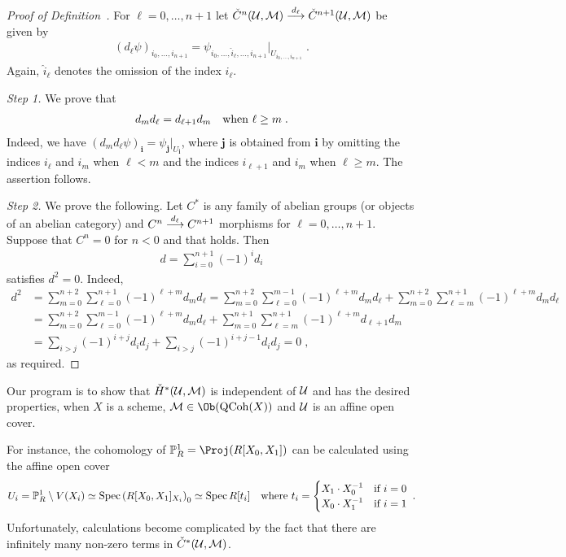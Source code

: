 \documentclass[a4paper,parskip=half,numbers=enddot, DIV=12]{scrreprt}
\begin{document}
\begin{proof}[Proof of Definition~]
	For $\ell=0,\ldots,n+1$ let $\check{C}^n(\Uu,\Mm)\morphism[d_\ell]\check{C}^{n+1}(\Uu,\Mm)$ be given by
	\begin{align*}
		(d_\ell\psi)_{i_0,\ldots,i_{n+1}}=\psi_{i_0,\ldots,\hat{i}_\ell,\ldots,i_{n+1}}|_{U_{i_0,\ldots,i_{n+1}}}\;.
	\end{align*}
	Again, $\hat{i}_\ell$ denotes the omission of the index $i_\ell$.
	
	\emph{Step 1.} We prove that
	\begin{align}\lbl{eq:simplicialStuff}
		d_md_\ell=d_{\ell+1}d_m\quad\text{when }\ell\geq m\;.
	\end{align}
	Indeed, we have $(d_md_\ell\psi)_{\mathbf{i}}=\psi_{\mathbf{j}}|_{U_{\mathbf{i}}}$, where $\mathbf{j}$ is obtained from $\mathbf{i}$ by omitting the indices $i_\ell$ and $i_m$ when $\ell<m$ and the indices $i_{\ell+1}$ and $i_m$ when $\ell\geq m$. The assertion follows.
	
	\emph{Step 2.} We prove the following. Let $C^*$ is any family of abelian groups (or objects of an abelian category) and $C^n\morphism[d_\ell]C^{n+1}$ morphisms for $\ell=0,\ldots,n+1$. Suppose that $C^n=0$ for $n<0$ and that  holds. Then 
	\begin{align*}
		d=\sum_{i=0}^{n+1}(-1)^id_i
	\end{align*}
	satisfies $d^2=0$. Indeed,
	\begin{align*}
		d^2&=\sum_{m=0}^{n+2}\sum_{\ell=0}^{n+1}(-1)^{\ell+m}d_md_\ell=\sum_{m=0}^{n+2}\sum_{\ell=0}^{m-1}(-1)^{\ell+m}d_md_\ell+\sum_{m=0}^{n+2}\sum_{\ell=m}^{n+1}(-1)^{\ell+m}d_md_\ell\\
		&=\sum_{m=0}^{n+2}\sum_{\ell=0}^{m-1}(-1)^{\ell+m}d_md_\ell+\sum_{m=0}^{n+1}\sum_{\ell=m}^{n+1}(-1)^{\ell+m}d_{\ell+1}d_m\\
		&=\sum_{i>j}(-1)^{i+j}d_id_j+\sum_{i>j}(-1)^{i+j-1}d_id_j=0\;,
	\end{align*}
	as required.
\end{proof}
\begin{rem*}
	Our program is to show that $\check{H}^*(\mathcal{U},\mathcal{M})$ is independent of $\mathcal{U}$ and has the desired properties, when $X$ is a scheme, $\Mm\in\Ob(\cat{QCoh}(X))$ and $\mathcal{U}$ is an affine open cover.
\end{rem*}
\begin{rem*}
	For instance, the cohomology of $\IP_R^1=\Proj(R[X_0,X_1])$ can be calculated using the affine open cover 
	\begin{align*}
		U_i=\mathbb{P}_R^1\setminus V(X_i)\simeq \operatorname{Spec} \left(R[X_0,X_1]_{X_i}\right)_0\simeq \operatorname{Spec} R[t_i]\quad\text{where }t_i=
		\begin{cases}
			X_1\cdot X_0^{-1} & \text{if }i=0\\
			X_0\cdot X_1^{-1} & \text{if }i=1
		\end{cases}\;.
	\end{align*}
	Unfortunately, calculations become complicated by the fact that there are infinitely many non-zero terms in $\check{C}^*(\mathcal{U},\mathcal{M})$.
\end{rem*}
\end{document}
